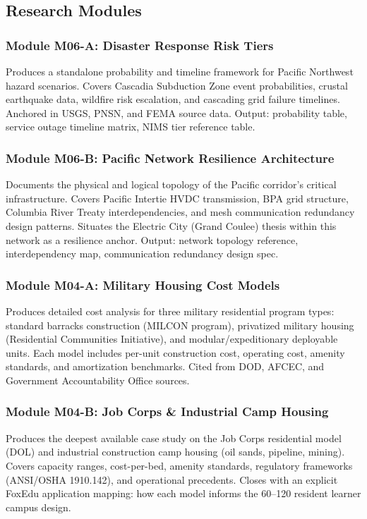 \documentclass[11pt,letterpaper]{article}
\begin{document}
\subsection{Research Modules}

\subsubsection{Module M06-A: Disaster Response Risk Tiers}
Produces a standalone probability and timeline framework for Pacific Northwest hazard scenarios. Covers Cascadia Subduction Zone event probabilities, crustal earthquake data, wildfire risk escalation, and cascading grid failure timelines. Anchored in USGS, PNSN, and FEMA source data. Output: probability table, service outage timeline matrix, NIMS tier reference table.

\subsubsection{Module M06-B: Pacific Network Resilience Architecture}
Documents the physical and logical topology of the Pacific corridor's critical infrastructure. Covers Pacific Intertie HVDC transmission, BPA grid structure, Columbia River Treaty interdependencies, and mesh communication redundancy design patterns. Situates the Electric City (Grand Coulee) thesis within this network as a resilience anchor. Output: network topology reference, interdependency map, communication redundancy design spec.

\subsubsection{Module M04-A: Military Housing Cost Models}
Produces detailed cost analysis for three military residential program types: standard barracks construction (MILCON program), privatized military housing (Residential Communities Initiative), and modular/expeditionary deployable units. Each model includes per-unit construction cost, operating cost, amenity standards, and amortization benchmarks. Cited from DOD, AFCEC, and Government Accountability Office sources.

\subsubsection{Module M04-B: Job Corps \& Industrial Camp Housing}
Produces the deepest available case study on the Job Corps residential model (DOL) and industrial construction camp housing (oil sands, pipeline, mining). Covers capacity ranges, cost-per-bed, amenity standards, regulatory frameworks (ANSI/OSHA 1910.142), and operational precedents. Closes with an explicit FoxEdu application mapping: how each model informs the 60--120 resident learner campus design.
\end{document}
